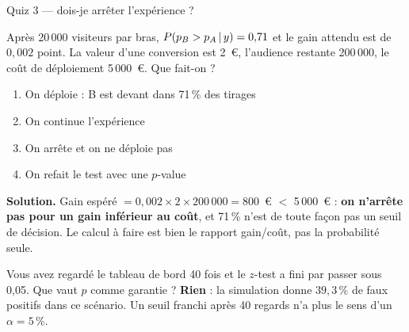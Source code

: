 \begin{frame}{Quiz 3 --- dois-je arrêter l'expérience ?}
\small
\begin{qbox}
Après 20\,000 visiteurs par bras, $P(p_B > p_A \,\vert\, y) = 0{,}71$ et le
gain attendu est de $0{,}002$ point. La valeur d'une conversion est 2~€,
l'audience restante 200\,000, le coût de déploiement 5\,000~€. Que fait-on ?
\vspace{2mm}
\begin{enumerate}
  \item[(A)] On déploie : B est devant dans 71\,\% des tirages
  \item[(B)] On continue l'expérience
  \item[(C)] On arrête et on ne déploie pas \checkmark
  \item[(D)] On refait le test avec une $p$-value
\end{enumerate}
\vspace{2mm}
\textcolor{byBlue}{\textbf{Solution.}} Gain espéré
$= 0{,}002 \times 2 \times 200\,000 = 800$~€ $<$ 5\,000~€ : \textbf{on
n'arrête pas pour un gain inférieur au coût}, et 71\,\% n'est de toute façon
pas un seuil de décision. Le calcul à faire est bien le rapport
gain/coût, pas la probabilité seule.
\end{qbox}
\vspace{1mm}
\begin{kbox}
Vous avez regardé le tableau de bord 40 fois et le $z$-test a fini par
passer sous 0,05. Que vaut $p$ comme garantie ?
\vspace{1mm}
\textbf{Rien} : la simulation donne $39{,}3\,\%$ de faux positifs dans ce
scénario. Un seuil franchi après 40 regards n'a plus le sens d'un
$\alpha = 5\,\%$.
\end{kbox}
\end{frame}

